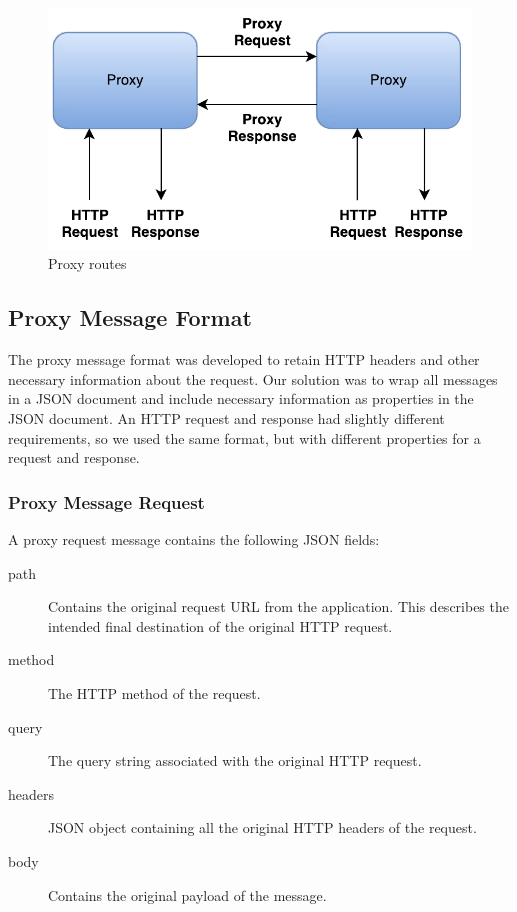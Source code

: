 \begin{figure}[h]
\centering
\includegraphics[scale=0.7]{images/dil_routes.pdf}
\caption{Proxy routes}
\label{figure:dil-routes}
\end{figure}

\subsection{Proxy Message Format}

The proxy message format was developed to retain HTTP headers and other
necessary information about the request. Our solution was to wrap all messages
in a JSON document and include necessary information as properties in the JSON
document. An HTTP request and response had slightly different requirements, so we
used the same format, but with different properties for a request and response.

\subsubsection{Proxy Message Request}

A proxy request message contains the following JSON fields:
\begin{description}
	\item[path] Contains the original request URL from the application. This describes the intended final destination of the original HTTP request.
	\item[method] The HTTP method of the request.
	\item[query] The query string associated with the original HTTP request.
	\item[headers] JSON object containing all the original HTTP headers of the request.
	\item[body] Contains the original payload of the message.
\end{description}

